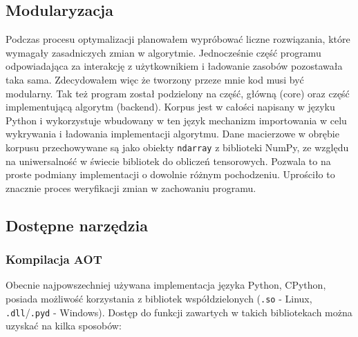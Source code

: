 \documentclass[10pt, a4paper]{article}
\newcommand{\code}[1]{\texttt{#1}}
\begin{document}
\begin{sloppypar}


    \subsection{Modularyzacja}


    Podczas procesu optymalizacji planowałem wypróbować liczne rozwiązania, które
    wymagały zasadniczych zmian w algorytmie. Jednocześnie część programu odpowiadająca za
    interakcję z użytkownikiem i ładowanie zasobów pozostawała taka sama. Zdecydowałem
    więc że tworzony przeze mnie kod musi być modularny. Tak też program został podzielony
    na część, główną (core) oraz część implementującą algorytm (backend). Korpus jest w całości
    napisany w języku Python i wykorzystuje wbudowany w ten język mechanizm importowania
    w celu wykrywania i ładowania implementacji algorytmu. Dane macierzowe w obrębie
    korpusu przechowywane są jako obiekty \code{ndarray} z biblioteki NumPy, ze względu
    na uniwersalność w świecie bibliotek do obliczeń tensorowych. Pozwala to na proste podmiany
    implementacji o dowolnie różnym pochodzeniu. Uprościło to znacznie proces
    weryfikacji zmian w zachowaniu programu.

    \subsection{Dostępne narzędzia}


    \subsubsection{Kompilacja AOT}



    Obecnie najpowszechniej używana implementacja języka Python, CPython, posiada możliwość
    korzystania z bibliotek współdzielonych (\code{.so} - Linux, \code{.dll}/\code{.pyd}
    - Windows). Dostęp do funkcji zawartych w takich bibliotekach można uzyskać na kilka
    sposobów:


\end{sloppypar}
\end{document}
